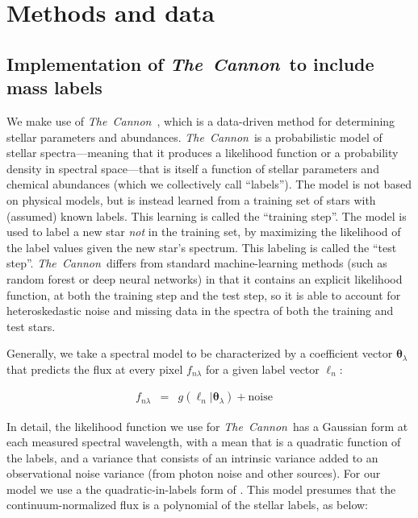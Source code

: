 \documentclass[12pt, preprint]{aastex}
\newcommand{\project}[1]{\textsl{#1}}
\newcommand{\tc}{\project{The~Cannon}}
\newcommand{\set}[1]{\bm{#1}}
\newcommand{\starlabel}{\ell}
\newcommand{\starlabelvec}{\set{\starlabel}}
\begin{document}
\section{Methods and data}
\label{sec:methods}

\subsection{Implementation of \tc\ to include mass labels}

We make use of \tc\ \citep{Ness2015}, which is a data-driven method for
determining stellar parameters and abundances.
\tc\ is a probabilistic model of stellar spectra---meaning that it
produces a likelihood function or a probability density in spectral
space---that is itself a function of stellar parameters and chemical
abundances (which we collectively call ``labels'').
The model is not based on physical models, but is instead learned
from a training set of stars with (assumed) known labels.
This learning is called the ``training step''.
The model is used to label a new star \emph{not} in the training set,
by maximizing the likelihood of the label values given the new star's
spectrum.
This labeling is called the ``test step''.
\tc\ differs from standard machine-learning methods
(such as random forest or deep neural networks) in that it contains an
explicit likelihood function, at both the training step and the test
step, so it is able to account for heteroskedastic noise and missing
data in the spectra of both the training and test stars.

Generally, we take a spectral model to be characterized by a coefficient vector $\set{\theta}_\lambda$
that predicts the flux at every pixel $f_{n\lambda}$ for a given label vector $\starlabelvec_n$:


\begin{eqnarray}
f_{n\lambda} &=&
g(\starlabelvec_n |  \set{\theta}_\lambda) + \mbox{noise}
\label{eq:specmodel}\quad 
\end{eqnarray}

In detail, the likelihood function we use for \tc\ has a
Gaussian form at each measured spectral wavelength, with a mean that
is a quadratic function of the labels, and a variance that consists of
an intrinsic variance added to an observational noise variance (from
photon noise and other sources). For our model we use a the quadratic-in-labels form of \citet{Ness2015}. This model presumes that the continuum-normalized flux is a polynomial of the stellar labels, as below: 
\end{document}
